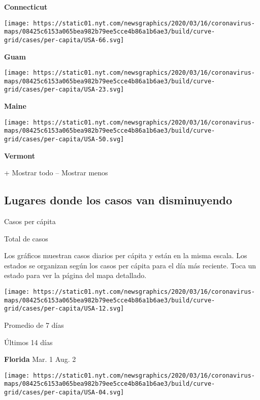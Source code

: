 \textbf{Connecticut}

\texttt{[image: https://static01.nyt.com/newsgraphics/2020/03/16/coronavirus-maps/08425c6153a065bea982b79ee5cce4b86a1b6ae3/build/curve-grid/cases/per-capita/USA-66.svg]}

\textbf{Guam}

\href{https://www.nytimes.com/interactive/2020/us/maine-coronavirus-cases.html}{}

\texttt{[image: https://static01.nyt.com/newsgraphics/2020/03/16/coronavirus-maps/08425c6153a065bea982b79ee5cce4b86a1b6ae3/build/curve-grid/cases/per-capita/USA-23.svg]}

\textbf{Maine}

\href{https://www.nytimes.com/interactive/2020/us/vermont-coronavirus-cases.html}{}

\texttt{[image: https://static01.nyt.com/newsgraphics/2020/03/16/coronavirus-maps/08425c6153a065bea982b79ee5cce4b86a1b6ae3/build/curve-grid/cases/per-capita/USA-50.svg]}

\textbf{Vermont}

+ Mostrar todo -- Mostrar menos

\hypertarget{lugares-donde-los-casos-van-disminuyendo}{%
\subsection{Lugares donde los casos van
disminuyendo}\label{lugares-donde-los-casos-van-disminuyendo}}

Casos per cápita

Total de casos

Los gráficos muestran casos diarios per cápita y están en la misma
escala. Los estados se organizan según los casos per cápita para el día
más reciente. Toca un estado para ver la página del mapa detallado.

\href{https://www.nytimes.com/interactive/2020/us/florida-coronavirus-cases.html}{}

\texttt{[image: https://static01.nyt.com/newsgraphics/2020/03/16/coronavirus-maps/08425c6153a065bea982b79ee5cce4b86a1b6ae3/build/curve-grid/cases/per-capita/USA-12.svg]}

Promedio de 7 días

Últimos 14 días

\textbf{Florida} Mar. 1 Aug. 2

\href{https://www.nytimes.com/interactive/2020/us/arizona-coronavirus-cases.html}{}

\texttt{[image: https://static01.nyt.com/newsgraphics/2020/03/16/coronavirus-maps/08425c6153a065bea982b79ee5cce4b86a1b6ae3/build/curve-grid/cases/per-capita/USA-04.svg]}

